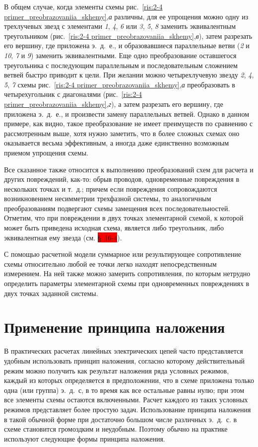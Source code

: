 В общем случае, когда элементы схемы рис.~\ref{ris:2-4 primer_preobrazovaniia_skhemy},\textit{а} различны, для ее упрощения можно одну из трехлучевых звезд с элементами \textit{1}, \textit{4}, \textit{6} или \textit{3}, \textit{5}, \textit{8} заменить эквивалентным треугольником (рис.~\ref{ris:2-4 primer_preobrazovaniia_skhemy},\textit{в}), затем разрезать его вершину, где приложена э.~д.~е., и образовавшиеся параллельные ветви (\textit{2} и \textit{10}, \textit{7} и \textit{9}) заменить эквивалентными. Еще одно преобразование оставшегося треугольника с последующим параллельным и последовательным сложением ветвей быстро приводит к цели. При желании можно четырехлучевую звезду \textit{2}, \textit{4}, \textit{5}, \textit{7} схемы рис.~\ref{ris:2-4 primer_preobrazovaniia_skhemy},\textit{а} преобразовать в четырехугольник с диагоналями (рис.~\ref{ris:2-4 primer_preobrazovaniia_skhemy},\textit{г}), а затем разрезать его вершину, где приложена э.~д.~е., и произвести замену параллельных ветвей. Однако в данном примере, как видно, такое преобразование не имеет преимуществ по сравнению с рассмотренным выше, хотя нужно заметить, что в более сложных схемах оно оказывается весьма эффективным, а иногда даже единственно возможным приемом упрощения схемы.

Все сказанное также относится к выполнению преобразований схем для расчета и других повреждений, как-то: обрыв проводов, одновременные повреждения в нескольких точках и т.~д.; причем если повреждения сопровождаются возникновением несимметрии трехфазной системы, то аналогичным преобразованиям подвергают схемы замещения всех последовательностей. Отметим, что при повреждении в двух точках элементарной схемой, к которой может быть приведена исходная схема, является либо треугольник, либо эквивалентная ему звезда (см. \colorbox{red}{§~16-4}).

С помощью расчетной модели суммарное или результирующее сопротивление схемы относительно любой ее точки легко находят непосредственным измерением. На ней также можно замерить сопротивления, по которым нетрудно определить параметры элементарной схемы при одновременных повреждениях в двух точках заданной системы.

\section{Применение принципа наложения}
\label{sec:2-6 primenenie_printcipa_nalozheniia}

В практических расчетах линейных электрических цепей часто представляется удобным использовать принцип наложения, согласно которому действительный режим можно получить как результат наложения ряда условных режимов, каждый из которых определяется в предположении, что в схеме приложена только одна (или группа) э.~д.~с, в то время как все остальные равны нулю; при этом все элементы схемы остаются включенными. Расчет каждого из таких условных режимов представляет более простую задач. Использование принципа наложения в такой обычной форме при достаточно большом числе различных э.~д.~с. в схеме становится громоздким и неудобным. Поэтому обычно на практике используют следующие формы принципа наложения.


